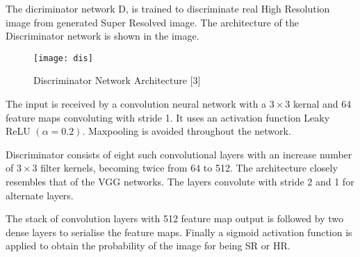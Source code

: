 The dicriminator network D, is trained to discriminate real High Resolution image from generated Super Resolved image. The architecture of the Discriminator network is shown in the image.

\begin{figure}[h]
\texttt{[image: dis]}
\caption{Discriminator Network Architecture [3]}
\end{figure}

The input is received by a convolution neural network with a $3\times 3$ kernal and 64 feature maps convoluting with stride 1. It uses an activation function Leaky ReLU $(\alpha = 0.2)$. Maxpooling is avoided throughout the network.

Discriminator consists of eight such convolutional layers with an increase number of $ 3\times 3 $ filter kernels, becoming twice from 64 to 512. The architecture closely resembles that of the VGG networks. The layers convolute with stride 2 and 1 for alternate layers.

The stack of convolution layers with 512 feature map output is followed by two dense layers to serialise the feature maps. Finally a sigmoid activation function is applied to obtain the probability of the image for being SR or HR.
